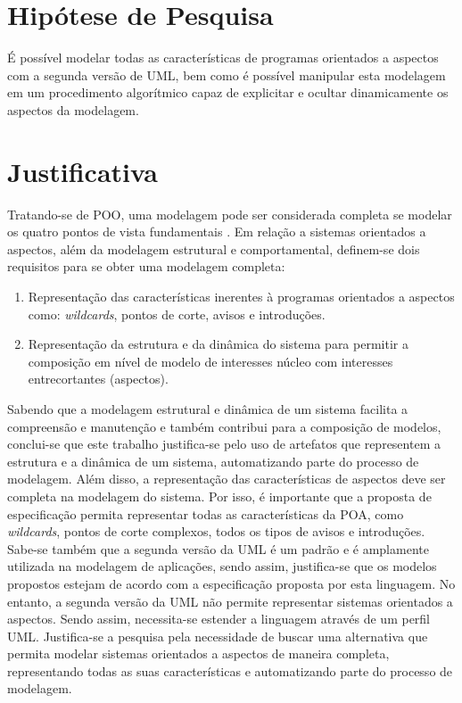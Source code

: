 \section{Hipótese de Pesquisa}

É possível modelar todas as características de programas orientados a aspectos com a segunda versão de UML, bem como é possível manipular esta
modelagem em um procedimento algorítmico capaz de explicitar e ocultar dinamicamente os aspectos da modelagem.

\section{Justificativa}

Tratando-se de POO, uma modelagem pode ser considerada completa se modelar os quatro pontos de vista fundamentais \cite{silva:00}. Em relação a
sistemas orientados a aspectos, além da modelagem estrutural e comportamental, definem-se dois requisitos para se obter uma modelagem
completa:

\begin{enumerate}
  \item Representação das características inerentes à programas orientados a aspectos como: \textit{wildcards}, pontos de corte, avisos e
  introduções. 
  \item Representação da estrutura e da dinâmica do sistema para permitir a composição em nível de modelo de interesses núcleo com interesses
  entrecortantes (aspectos).
\end{enumerate}

Sabendo que a modelagem estrutural e dinâmica de um sistema facilita a compreensão e manutenção e também contribui para a composição de modelos,
conclui-se que este trabalho justifica-se pelo uso de artefatos que representem a estrutura e a dinâmica de um sistema, automatizando parte do
processo de modelagem. Além disso, a representação das características de aspectos deve ser completa na modelagem do sistema. Por isso, é importante
que a proposta de especificação permita representar todas as características da POA, como \textit{wildcards}, pontos de corte complexos, todos os
tipos de avisos e introduções. Sabe-se também que a segunda versão da UML é um padrão e é amplamente utilizada na modelagem de aplicações, sendo
assim, justifica-se que os modelos propostos estejam de acordo com a especificação proposta por esta linguagem. No entanto, a segunda versão da UML não 
permite representar sistemas orientados a aspectos. Sendo assim, necessita-se estender a linguagem através de um perfil UML. Justifica-se a pesquisa
pela necessidade de buscar uma alternativa que permita modelar sistemas orientados a aspectos de maneira completa, representando todas as suas
características e automatizando parte do processo de modelagem.

